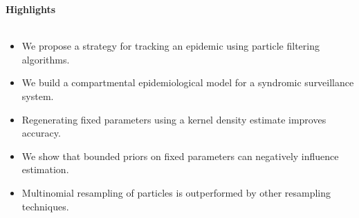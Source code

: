 \documentclass{article}
\begin{document}
{\bf Highlights} \\
\
\begin{itemize}
\item We propose a strategy for tracking an epidemic using particle filtering algorithms.
\item We build a compartmental epidemiological model for a syndromic surveillance system.
\item Regenerating fixed parameters using a kernel density estimate improves accuracy.
\item We show that bounded priors on fixed parameters can negatively influence estimation.
\item Multinomial resampling of particles is outperformed by other resampling techniques.
\end{itemize}
\end{document}
